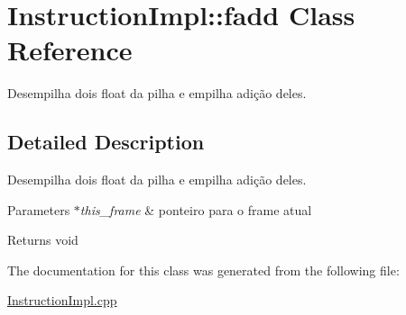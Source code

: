 \hypertarget{class_instruction_impl_1_1fadd}{}\section{Instruction\+Impl\+:\+:fadd Class Reference}
\label{class_instruction_impl_1_1fadd}


Desempilha dois float da pilha e empilha adição deles.  




\subsection{Detailed Description}
Desempilha dois float da pilha e empilha adição deles. 


\begin{DoxyParams}{Parameters}
{\em $\ast$this\+\_\+frame} & ponteiro para o frame atual \\
\hline
\end{DoxyParams}
\begin{DoxyReturn}{Returns}
void 
\end{DoxyReturn}


The documentation for this class was generated from the following file\+:\begin{DoxyCompactItemize}
\item 
\hyperlink{_instruction_impl_8cpp}{Instruction\+Impl.\+cpp}\end{DoxyCompactItemize}
